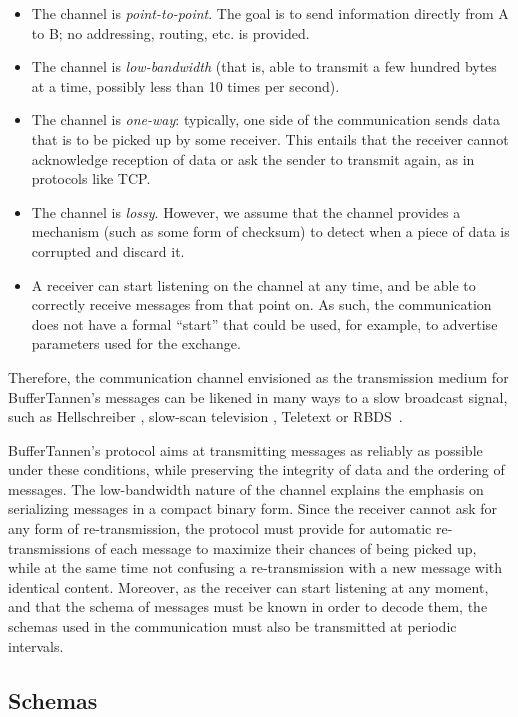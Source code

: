 \begin{itemize}
\item The channel is \emph{point-to-point}. The goal is to send information   directly from A to B; no addressing, routing, etc. is provided.
\item The channel is \emph{low-bandwidth} (that is, able to transmit a few hundred bytes at a time, possibly less than 10 times per second).
\item The channel is \emph{one-way}: typically, one side of the communication sends data that is to be picked up by some receiver. This entails that the receiver cannot acknowledge reception of data or ask the sender to transmit again, as in protocols like TCP.
\item The channel is \emph{lossy}. However, we assume that the channel provides a mechanism (such as some form of checksum) to detect when a piece of data is corrupted and discard it.
\item A receiver can start listening on the channel at any time, and be able to correctly receive messages from that point on. As such, the communication does not have a formal ``start'' that could be used, for example, to advertise parameters used for the exchange.
\end{itemize}

Therefore, the communication channel envisioned as the transmission medium for BufferTannen's messages can be likened in many ways to a slow broadcast signal, such as Hellschreiber \citep{hells}, slow-scan television \citep{slowtv}, Teletext \citep{teletext} or RBDS~\citep{rbds}.

BufferTannen's protocol aims at transmitting messages as reliably as possible under these conditions, while preserving the integrity of data and the ordering of messages. The low-bandwidth nature of the channel explains the emphasis on serializing messages in a compact binary form. Since the receiver cannot ask for any form of re-transmission, the protocol must provide for automatic re-transmissions of each message to maximize their chances of being picked up, while at the same time not confusing a re-transmission with a new message with identical content. Moreover, as the receiver can start listening at any moment, and that the schema of messages must be known in order to decode them, the schemas used in the communication must also be transmitted at periodic intervals.

\subsection{Schemas}
\setcounter{paragraph}{0}

